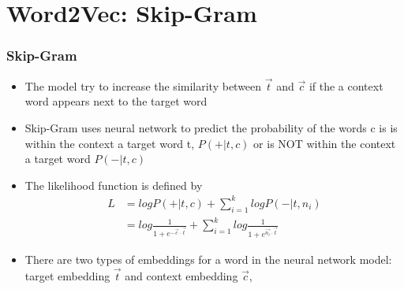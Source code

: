 \documentclass[notheorems, aspectratio=54]{beamer}
\begin{document}
\section{Word2Vec: Skip-Gram}
\begin{frame}
\frametitle{Skip-Gram}

\begin{itemize}


\item The model try to increase the similarity between $\vec{t}$ and $\vec{c}$ if the a context word appears next to the target word

\item Skip-Gram uses neural network to predict the probability of the  words c is is within the context a target word t, $P(+|t, c)$ or is NOT within the context a target word $P(-|t, c)$

\item The likelihood function is defined by
\begin{align*}
L&=logP(+|t, c)+\sum_{i=1}^{k}logP(-|t,n_i)\\
&=log\frac{1}{1+e^{-\vec{c}\cdot\vec{t}}}+\sum_{i=1}^klog\frac{1}{1+e^{\vec{n_i}\cdot\vec{t}}}
\end{align*}

\item There are two types of embeddings for a word in the neural network model: target embedding $\vec{t}$ and context embedding $\vec{c}$, 
\end{itemize}

\end{frame}
\end{document}

